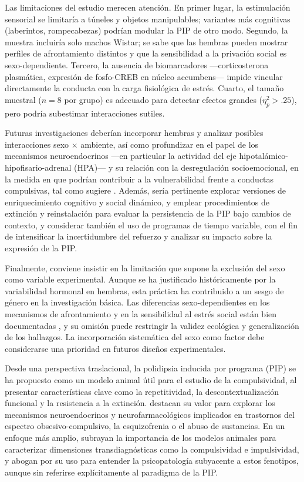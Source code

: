 \documentclass[12pt,a4paper]{article}
\begin{document}
\begin{multicols}{2}
Las limitaciones del estudio merecen atención. En primer lugar, la estimulación sensorial se limitaría a túneles y objetos manipulables; variantes más cognitivas (laberintos, rompecabezas) podrían modular la PIP de otro modo. Segundo, la muestra incluiría solo machos Wistar; se sabe que las hembras pueden mostrar perfiles de afrontamiento distintos y que la sensibilidad a la privación social es sexo-dependiente. Tercero, la ausencia de biomarcadores —corticosterona plasmática, expresión de fosfo-CREB en núcleo accumbens— impide vincular directamente la conducta con la carga fisiológica de estrés. Cuarto, el tamaño muestral ($n = 8$ por grupo) es adecuado para detectar efectos grandes ($\eta^2_p > .25$), pero podría subestimar interacciones sutiles.

Futuras investigaciones deberían incorporar hembras y analizar posibles interacciones sexo × ambiente, así como profundizar en el papel de los mecanismos neuroendocrinos —en particular la actividad del eje hipotalámico-hipofisario-adrenal (HPA)— y su relación con la desregulación socioemocional, en la medida en que podrían contribuir a la vulnerabilidad frente a conductas compulsivas, tal como sugiere \citet{MartinGonzalez2022}. Además, sería pertinente explorar versiones de enriquecimiento cognitivo y social dinámico, y emplear procedimientos de extinción y reinstalación para evaluar la persistencia de la PIP bajo cambios de contexto, y considerar también el uso de programas de tiempo variable, con el fin de intensificar la incertidumbre del refuerzo y analizar su impacto sobre la expresión de la PIP.


Finalmente, conviene insistir en la limitación que supone la exclusión del sexo como variable experimental. Aunque se ha justificado históricamente por la variabilidad hormonal en hembras, esta práctica ha contribuido a un sesgo de género en la investigación básica. Las diferencias sexo-dependientes en los mecanismos de afrontamiento y en la sensibilidad al estrés social están bien documentadas \citep{Bowman2006, Barha2011}, y su omisión puede restringir la validez ecológica y generalización de los hallazgos. La incorporación sistemática del sexo como factor debe considerarse una prioridad en futuros diseños experimentales.

Desde una perspectiva traslacional, la polidipsia inducida por programa (PIP) se ha propuesto como un modelo animal útil para el estudio de la compulsividad, al presentar características clave como la repetitividad, la descontextualización funcional y la resistencia a la extinción. \citet{Moreno2012} destacan su valor para explorar los mecanismos neuroendocrinos y neurofarmacológicos implicados en trastornos del espectro obsesivo-compulsivo, la esquizofrenia o el abuso de sustancias. En un enfoque más amplio, \citet{Fineberg2010} subrayan la importancia de los modelos animales para caracterizar dimensiones transdiagnósticas como la compulsividad e impulsividad, y abogan por su uso para entender la psicopatología subyacente a estos fenotipos, aunque sin referirse explícitamente al paradigma de la PIP.


\end{multicols}
\end{document}
